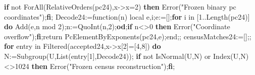 \documentclass[
  10pt,
  letterpaper,
]{article}
\newenvironment{Shaded}{}{}
\newcommand{\BuiltInTok}[1]{\textcolor[rgb]{0.00,0.50,0.00}{#1}}
\newcommand{\ConstantTok}[1]{\textcolor[rgb]{0.53,0.00,0.00}{#1}}
\newcommand{\ControlFlowTok}[1]{\textcolor[rgb]{0.00,0.44,0.13}{\textbf{#1}}}
\newcommand{\ExtensionTok}[1]{#1}
\newcommand{\FloatTok}[1]{\textcolor[rgb]{0.25,0.63,0.44}{#1}}
\newcommand{\FunctionTok}[1]{\textcolor[rgb]{0.02,0.16,0.49}{#1}}
\newcommand{\NormalTok}[1]{#1}
\newcommand{\OperatorTok}[1]{\textcolor[rgb]{0.40,0.40,0.40}{#1}}
\newcommand{\OtherTok}[1]{\textcolor[rgb]{0.00,0.44,0.13}{#1}}
\newcommand{\StringTok}[1]{\textcolor[rgb]{0.25,0.44,0.63}{#1}}
\newcommand{\VariableTok}[1]{\textcolor[rgb]{0.10,0.09,0.49}{#1}}
\begin{document}
\begin{Shaded}
\begin{Highlighting}[]
\ControlFlowTok{if} \ConstantTok{not} \BuiltInTok{ForAll}\NormalTok{(}\BuiltInTok{RelativeOrders}\NormalTok{(}\VariableTok{pc24}\NormalTok{)}\OperatorTok{,}\VariableTok{x}\OperatorTok{{-}\textgreater{}}\VariableTok{x}\OperatorTok{=}\FloatTok{2}\NormalTok{) }\ControlFlowTok{then} \BuiltInTok{Error}\NormalTok{(}\StringTok{"Frozen binary pc coordinates"}\NormalTok{)}\OperatorTok{;}\ControlFlowTok{fi}\OperatorTok{;}
\VariableTok{Decode24}\OperatorTok{:=}\FunctionTok{function}\NormalTok{(}\VariableTok{n}\NormalTok{) }\ExtensionTok{local} \VariableTok{e}\OperatorTok{,}\VariableTok{i}\OperatorTok{;}\VariableTok{e}\OperatorTok{:=}\NormalTok{[]}\OperatorTok{;}\ControlFlowTok{for} \VariableTok{i} \ExtensionTok{in}\NormalTok{ [}\FloatTok{1}\OperatorTok{..}\BuiltInTok{Length}\NormalTok{(}\VariableTok{pc24}\NormalTok{)] }\ControlFlowTok{do} \BuiltInTok{Add}\NormalTok{(}\VariableTok{e}\OperatorTok{,}\VariableTok{n} \OtherTok{mod} \FloatTok{2}\NormalTok{)}\OperatorTok{;}\VariableTok{n}\OperatorTok{:=}\BuiltInTok{QuoInt}\NormalTok{(}\VariableTok{n}\OperatorTok{,}\FloatTok{2}\NormalTok{)}\OperatorTok{;}\ControlFlowTok{od}\OperatorTok{;}\ControlFlowTok{if} \VariableTok{n}\OperatorTok{\textless{}\textgreater{}}\FloatTok{0} \ControlFlowTok{then} \BuiltInTok{Error}\NormalTok{(}\StringTok{"Coordinate overflow"}\NormalTok{)}\OperatorTok{;}\ControlFlowTok{fi}\OperatorTok{;}\ExtensionTok{return} \BuiltInTok{PcElementByExponents}\NormalTok{(}\VariableTok{pc24}\OperatorTok{,}\VariableTok{e}\NormalTok{)}\OperatorTok{;}\FunctionTok{end}\OperatorTok{;;}
\VariableTok{censusMatches24}\OperatorTok{:=}\NormalTok{[]}\OperatorTok{;;}
\ControlFlowTok{for} \VariableTok{entry} \ExtensionTok{in} \BuiltInTok{Filtered}\NormalTok{(}\VariableTok{accepted24}\OperatorTok{,}\VariableTok{x}\OperatorTok{{-}\textgreater{}}\VariableTok{x}\NormalTok{[}\FloatTok{2}\NormalTok{]}\OperatorTok{=}\NormalTok{[}\FloatTok{4}\OperatorTok{,}\FloatTok{8}\NormalTok{]) }\ControlFlowTok{do}
 \VariableTok{N}\OperatorTok{:=}\BuiltInTok{Subgroup}\NormalTok{(}\VariableTok{U}\OperatorTok{,}\BuiltInTok{List}\NormalTok{(}\VariableTok{entry}\NormalTok{[}\FloatTok{1}\NormalTok{]}\OperatorTok{,}\VariableTok{Decode24}\NormalTok{))}\OperatorTok{;}
 \ControlFlowTok{if} \ConstantTok{not} \BuiltInTok{IsNormal}\NormalTok{(}\VariableTok{U}\OperatorTok{,}\VariableTok{N}\NormalTok{) }\ConstantTok{or} \BuiltInTok{Index}\NormalTok{(}\VariableTok{U}\OperatorTok{,}\VariableTok{N}\NormalTok{)}\OperatorTok{\textless{}\textgreater{}}\FloatTok{1024} \ControlFlowTok{then} \BuiltInTok{Error}\NormalTok{(}\StringTok{"Frozen census reconstruction"}\NormalTok{)}\OperatorTok{;}\ControlFlowTok{fi}\OperatorTok{;}

\end{Highlighting}
\end{Shaded}
\end{document}
